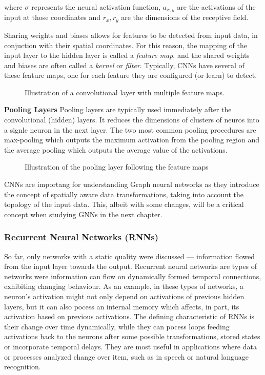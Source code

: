 where $\sigma$ represents the neural activation function, $a_{x,y}$
are the activations of the input at those coordinates and $r_x, r_y$
are the dimensions of the receptive field.

Sharing weights and biases allows for features to be detected
from input data, in conjuction with their spatial coordinates.
For this reason, the mapping of the input layer to the hidden
layer is called a \textit{feature map}, and the shared weights
and biases are often called a \textit{kernel} or \textit{filter}.
Typically, CNNs have several of these feature maps, one for each
feature they are configured (or learn) to detect.

\begin{figure}[H]
  \centering
  
  \caption{Illustration of a convolutional layer with multiple feature maps.}
  \label{fig:feature_maps}
\end{figure}

\textbf{Pooling Layers} Pooling layers are typically
used immediately after the convolutional (hidden) layers.  It reduces
the dimensions of clusters of neuros into a signle neuron in the next
layer. The two most common pooling procedures are max-pooling which
outputs the maximum activation from the pooling region and the average
pooling which outputs the average value of the activations.

\begin{figure}[H]
  \centering
  
  \caption{Illustration of the pooling layer following the feature maps}
  \label{fig:pooling}
\end{figure}

CNNs are importang for understanding Graph neural networks as they
introduce the concept of spatially aware data transformations, taking
into account the topology of the input data. This, albeit with some
changes, will be a critical concept when studying GNNs in the next chapter.

\subsubsection{Recurrent Neural Networks (RNNs)}

So far, only networks with a static quality were discussed ---
information flowed from the input layer towards the output. Recurrent
neural networks are types of networks were information can flow on
dynamically formed temporal connections, exhibiting changing
behaviour. As an example, in these types of networks, a neuron's
activation might not only depend on activations of previous hidden
layers, but it can also pocess an internal memory which affects, in part,
its activation based on previous activations. The defining characteristic
of RNNs is their change over time dynamically, while they can
pocess loops feeding activations back to the neurons after some
possible transformations, stored states or incorporate temporal delays.
They are most useful in applications where data or processes analyzed
change over item, such as in speech or natural language recognition. 


